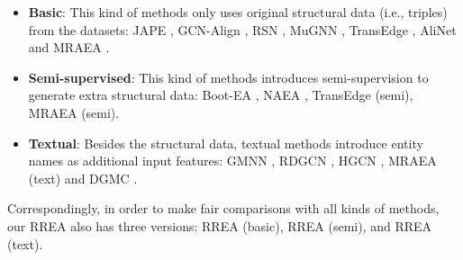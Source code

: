 \documentclass[sigconf,camera-ready]{acmart}
\begin{document}
\begin{itemize}
  \item \textbf{Basic}:
This kind of methods only uses original structural data (i.e., triples) from the datasets:
JAPE \cite{DBLP:conf/semweb/SunHL17}, GCN-Align \cite{DBLP:conf/emnlp/WangLLZ18}, RSN \cite{DBLP:conf/icml/GuoSH19}, MuGNN \cite{DBLP:conf/acl/CaoLLLLC19}, TransEdge \cite{DBLP:conf/semweb/SunHHCGQ19}, AliNet \cite{sun2019knowledge} and MRAEA \cite{DBLP:conf/wsdm/MaoWXLW20}.
  \item \textbf{Semi-supervised}:
  This kind of methods introduces semi-supervision to generate extra structural data:
Boot-EA \cite{DBLP:conf/ijcai/SunHZQ18}, NAEA \cite{DBLP:conf/ijcai/ZhuZ0TG19}, TransEdge (semi), MRAEA (semi).
  \item \textbf{Textual}:
Besides the structural data, textual methods introduce entity names as additional input features:
GMNN \cite{DBLP:conf/acl/XuWYFSWY19}, RDGCN \cite{DBLP:conf/ijcai/WuLF0Y019}, HGCN \cite{DBLP:conf/emnlp/WuLFWZ19}, MRAEA (text) and DGMC \cite{DBLP:journals/corr/abs-2001-09621}.
\end{itemize}
Correspondingly, in order to make fair comparisons with all kinds of methods, our RREA also has three versions: RREA (basic), RREA (semi), and RREA (text).

\begin{table}[t]
\renewcommand\arraystretch{1.3}
\centering
{}
\caption{Experimental results of textual methods.}
\label{table:textual}
\end{table}
\end{document}
